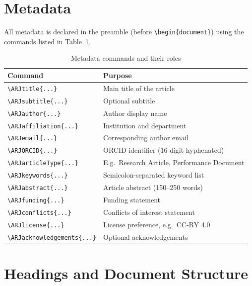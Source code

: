 \section{Metadata}

All metadata is declared in the preamble (before \texttt{\textbackslash begin\{document\}})
using the commands listed in Table~\ref{tab:metadata}.

\begin{table}[ht]
\centering
\caption{Metadata commands and their roles}
\label{tab:metadata}
\begin{tabular}{lp{9cm}}
\toprule
Command & Purpose \\
\midrule
\verb|\ARJtitle{...}|          & Main title of the article \\
\verb|\ARJsubtitle{...}|       & Optional subtitle \\
\verb|\ARJauthor{...}|         & Author display name \\
\verb|\ARJaffiliation{...}|    & Institution and department \\
\verb|\ARJemail{...}|          & Corresponding author email \\
\verb|\ARJORCID{...}|          & ORCID identifier (16-digit hyphenated) \\
\verb|\ARJarticleType{...}|    & E.g.\ Research Article, Performance Document \\
\verb|\ARJkeywords{...}|       & Semicolon-separated keyword list \\
\verb|\ARJabstract{...}|       & Article abstract (150–250 words) \\
\verb|\ARJfunding{...}|        & Funding statement \\
\verb|\ARJconflicts{...}|      & Conflicts of interest statement \\
\verb|\ARJlicense{...}|        & License preference, e.g.\ CC-BY 4.0 \\
\verb|\ARJacknowledgements{...}| & Optional acknowledgements \\
\bottomrule
\end{tabular}
\end{table}

\section{Headings and Document Structure}

